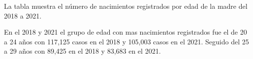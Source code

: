 La tabla muestra el número de nacimientos registrados por edad de la madre del 2018 a 2021. 

En el 2018 y 2021 el grupo de edad con mas nacimientos registrados fue el de 20 a 24 años con 117,125 casos en el 2018 y 105,003 casos en el 2021. Seguido del 25 a 29 años con 89,425 en el 2018 y 83,683 en el 2021.   